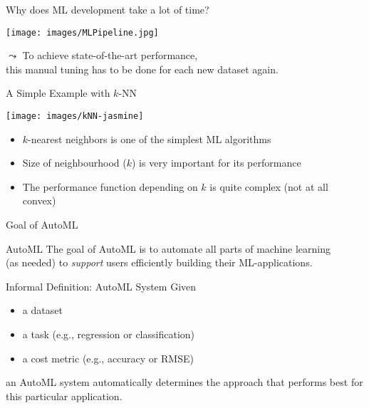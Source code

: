 \begin{frame}[c]{Why does ML development take a lot of time?}

\centering
\texttt{[image: images/MLPipeline.jpg]}

\bigskip\bigskip\bigskip\bigskip
$\leadsto$ To achieve state-of-the-art performance,\\ this manual tuning has to be done for each new dataset again.

\end{frame}
\begin{frame}[c]{A Simple Example with $k$-NN}

\centering
\texttt{[image: images/kNN-jasmine]}

\begin{itemize}
  \item $k$-nearest neighbors is one of the simplest ML algorithms
  \pause
  \item Size of neighbourhood ($k$) is very important for its performance
  \pause
  \item The performance function depending on $k$ is quite complex (not at all convex)
\end{itemize}

\end{frame}
\begin{frame}[c]{Goal of AutoML}

\begin{block}{AutoML}
The goal of AutoML is to automate all parts of machine learning\\ (as needed)
to \emph{support} users efficiently building their ML-applications.
\end{block}

\bigskip
\pause

\begin{block}{Informal Definition: AutoML System}
Given
\begin{itemize}
  \item a dataset
  \item a task (e.g., regression or classification)
  \item a cost metric (e.g., accuracy or RMSE)
\end{itemize}
an AutoML system automatically determines the approach 
that performs best for this particular application.
\end{block}

\end{frame}
